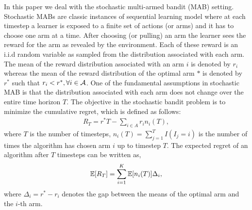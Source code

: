 In this paper we deal with the stochastic multi-armed bandit (MAB) setting. Stochastic MABs are classic instances of sequential learning model where at each timestep a learner is exposed to a finite set of actions (or arms) and it has to choose one arm at a time. After choosing (or pulling) an arm the learner sees the reward for the arm as revealed by the environment. Each of these reward is an i.i.d random variable as sampled from the distribution associated with each arm. The mean of the reward distribution associated with an arm $i$ is denoted by $r_i$ whereas the mean of the reward distribution of the optimal arm $*$ is denoted by $r^*$ such that $r_i < r^*, \forall i\in \mathcal{A}$. One of the fundamental assumptions in stochastic MAB is that the distribution associated with each arm does not change over the entire time horizon $T$. The objective in the stochastic bandit problem is to minimize the cumulative regret, which is defined as follows:
\begin{align*}
R_{T}=r^{*}T - \sum_{i\in A} r_{i}n_{i}(T),
\end{align*}
where $T$ is the number of timesteps, $n_{i}(T)=\sum_{j=1}^T I(I_j=i)$ is the number of times the algorithm has chosen arm $i$ up to timestep $T$.
The expected regret of an algorithm after $T$ timesteps can be written as,
\begin{align*}
\mathbb{E}[R_{T}]= \sum_{i=1}^K \mathbb{E}[n_i (T)] \Delta_i,
\end{align*}
where $\Delta_{i}=r^{*}-r_{i}$ denotes the gap between the means of the optimal arm and the $i$-th arm.
